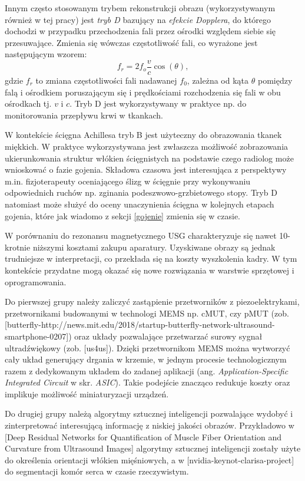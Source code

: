 Innym często stosowanym trybem rekonstrukcji obrazu (wykorzystywanym również w tej pracy) jest \textit{tryb D} bazujący na \textit{efekcie Dopplera}, do którego dochodzi w przypadku przechodzenia fali przez ośrodki względem siebie się przesuwające. Zmienia się wówczas częstotliwość fali, co wyrażone jest następującym wzorem:
\begin{equation}
f_r = 2 f_o\frac{v}{c}\cos(\theta),
\end{equation} 
gdzie $f_r$ to zmiana częstotliwości fali nadawanej $f_0$, zależna od kąta $\theta$ pomiędzy falą i ośrodkiem poruszającym się i prędkościami rozchodzenia się fali w obu ośrodkach tj. $v$ i $c$. Tryb D jest wykorzystywany w praktyce np. do monitorowania przepływu krwi w tkankach. 

W kontekście ścięgna Achillesa tryb B jest użyteczny do obrazowania tkanek miękkich. W praktyce wykorzystywana jest zwłaszcza możliwość zobrazowania ukierunkowania struktur włókien ścięgnistych na podstawie czego radiolog może wnioskować o fazie gojenia. Składowa czasowa jest interesująca z perspektywy m.in. fizjoterapeuty oceniającego ślizg w ścięgnie przy wykonywaniu odpowiednich ruchów np. zginania podeszwowo-grzbietowego stopy. Tryb D natomiast może służyć do oceny unaczynienia ścięgna w kolejnych etapach gojenia, które jak wiadomo z sekcji \ref{gojenie} zmienia się w czasie.

W porównaniu do rezonansu magnetycznego USG charakteryzuje się nawet 10-krotnie niższymi kosztami zakupu aparatury. Uzyskiwane obrazy są jednak trudniejsze w interpretacji, co przekłada się na koszty wyszkolenia kadry. W tym kontekście przydatne mogą okazać się nowe rozwiązania w warstwie sprzętowej i oprogramowania. 

Do pierwszej grupy należy zaliczyć zastąpienie przetworników z piezoelektrykami, przetwornikami budowanymi w technologi MEMS np. cMUT, czy pMUT (zob. [butterfly-http://news.mit.edu/2018/startup-butterfly-network-ultrasound-smartphone-0207]) oraz układy pozwalające przetwarzać surowy sygnał ultradźwiękowy (zob. [us4us]). Dzięki przetwornikom MEMS można wytworzyć cały układ generujący drgania w krzemie, w jednym procesie technologicznym razem z dedykowanym układem do zadanej aplikacji (ang. \textit{Application-Specific Integrated Circuit} w skr. \textit{ASIC}). Takie podejście znacząco redukuje koszty oraz implikuje możliwość miniaturyzacji urządzeń.

Do drugiej grupy należą algorytmy sztucznej inteligencji pozwalające wydobyć i zinterpretować interesującą informację z niskiej jakości obrazów. Przykładowo w [Deep Residual Networks for Quantification
of Muscle Fiber Orientation and Curvature
from Ultrasound Images] algorytmy sztucznej inteligencji zostały użyte do określenia orientacji włókien mięśniowych, a w [nvidia-keynot-clarisa-project] do segmentacji komór serca w czasie rzeczywistym. 

